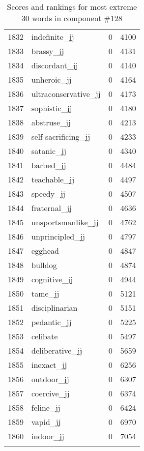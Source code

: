 \begin{longtable}[!htbp]{| rlr@{.}l |}
    1832 & indefinite\_jj & 0 & 4100 \\
    1833 & brassy\_jj & 0 & 4131 \\
    1834 & discordant\_jj & 0 & 4140 \\
    1835 & unheroic\_jj & 0 & 4164 \\
    1836 & ultraconservative\_jj & 0 & 4173 \\
    1837 & sophistic\_jj & 0 & 4180 \\
    1838 & abstruse\_jj & 0 & 4213 \\
    1839 & self-sacrificing\_jj & 0 & 4233 \\
    1840 & satanic\_jj & 0 & 4340 \\
    1841 & barbed\_jj & 0 & 4484 \\
    1842 & teachable\_jj & 0 & 4497 \\
    1843 & speedy\_jj & 0 & 4507 \\
    1844 & fraternal\_jj & 0 & 4636 \\
    1845 & unsportsmanlike\_jj & 0 & 4762 \\
    1846 & unprincipled\_jj & 0 & 4797 \\
    1847 & egghead & 0 & 4847 \\
    1848 & bulldog & 0 & 4874 \\
    1849 & cognitive\_jj & 0 & 4944 \\
    1850 & tame\_jj & 0 & 5121 \\
    1851 & disciplinarian & 0 & 5151 \\
    1852 & pedantic\_jj & 0 & 5225 \\
    1853 & celibate & 0 & 5497 \\
    1854 & deliberative\_jj & 0 & 5659 \\
    1855 & inexact\_jj & 0 & 6256 \\
    1856 & outdoor\_jj & 0 & 6307 \\
    1857 & coercive\_jj & 0 & 6374 \\
    1858 & feline\_jj & 0 & 6424 \\
    1859 & vapid\_jj & 0 & 6970 \\
    1860 & indoor\_jj & 0 & 7054 \\
    \hline
    \caption{Scores and rankings for most extreme 30 words in component \#128} \\
\end{longtable}

